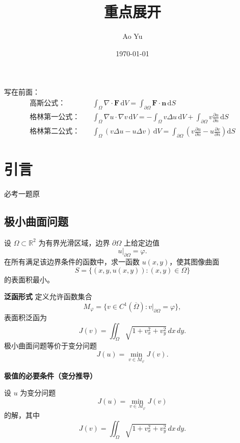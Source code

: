 \documentclass[12pt,a4paper]{ctexart}
\title{\textbf{重点展开}}
\author{Ao Yu}
\date{\today}
\begin{document}
	
	\maketitle
	
	写在前面：
	\begin{align*}
		\text{高斯公式：} \quad & \int_{\Omega} \nabla \cdot \mathbf{F} \, \mathrm{d}V = \int_{\partial \Omega} \mathbf{F} \cdot \mathbf{n} \, \mathrm{d}S \\[10pt]
		\text{格林第一公式：} \quad & \int_{\Omega} \nabla u \cdot \nabla v \, \mathrm{d}V = -\int_{\Omega} v \Delta u \, \mathrm{d}V + \int_{\partial \Omega} v \frac{\partial u}{\partial n} \, \mathrm{d}S \\[10pt]
		\text{格林第二公式：} \quad & \int_{\Omega} (v \Delta u - u \Delta v) \, \mathrm{d}V = \int_{\partial \Omega} \left( v \frac{\partial u}{\partial n} - u \frac{\partial v}{\partial n} \right) \mathrm{d}S
	\end{align*}
	\newpage
	\section{引言}
	
	必考一题原
	
	\subsection{极小曲面问题}

	设 $\Omega \subset \mathbb{R}^2$ 为有界光滑区域，边界 $\partial\Omega$ 上给定边值
	\[
	u|_{\partial\Omega} = \varphi .
	\]
	在所有满足该边界条件的函数中，求一函数 $u(x,y)$，使其图像曲面
	\[
	S=\{(x,y,u(x,y)):(x,y)\in\Omega\}
	\]
	的表面积最小。
	
	\medskip
	
	\textbf{泛函形式}  
	定义允许函数集合
	\[
	M_\varphi=\{v\in C^1(\overline{\Omega}) : v|_{\partial\Omega}=\varphi\},
	\]
	表面积泛函为
	\[
	J(v)=\iint_{\Omega}\sqrt{1+v_x^2+v_y^2}\,dx\,dy.
	\]
	极小曲面问题等价于变分问题
	\[
	J(u)=\min_{v\in M_\varphi} J(v).
	\]
	
	\medskip
	
	\textbf{极值的必要条件（变分推导）}
	
	设 $u$ 为变分问题
	\[
	J(u)=\min_{v\in M_\varphi}J(v)
	\]
	的解，其中
	\[
	J(v)=\iint_{\Omega}\sqrt{1+v_x^2+v_y^2}\,dx\,dy.
	\]
	
\end{document}
